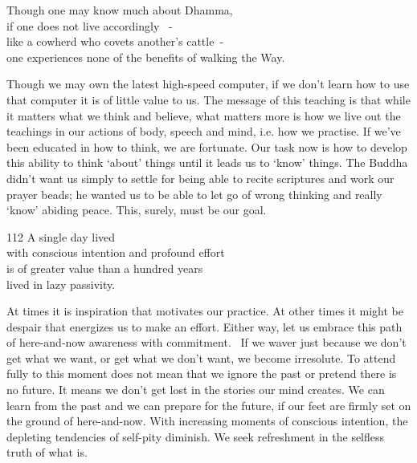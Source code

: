 
\begin{dhpVerse}{19}
\label{dhp-19}
Though one may know much about Dhamma,\\
if one does not live accordingly  -\\
like a cowherd who covets another's cattle -\\
one experiences none of the benefits of walking the Way.
\end{dhpVerse}

\begin{dhpRefl}
Though we may own the latest high-speed computer, if we don't learn how to use that computer it is of little value to us. The message of this teaching is that while it matters what we think and believe, what matters more is how we live out the teachings in our actions of body, speech and mind, i.e. how we practise. If we've been educated in how to think, we are fortunate. Our task now is how to develop this ability to think `about' things until it leads us to `know' things. The Buddha didn't want us simply to settle for being able to recite scriptures and work our prayer beads; he wanted us to be able to let go of wrong thinking and really `know' abiding peace. This, surely, must be our goal.
\end{dhpRefl}


\begin{dhpVerse}{112}
\label{dhp-112}
A single day lived\\
with conscious intention and profound effort\\
is of greater value than a hundred years\\
lived in lazy passivity.
\end{dhpVerse}

\begin{dhpRefl}
At times it is inspiration that motivates our practice. At other times it might be despair that energizes us to make an effort. Either way, let us embrace this path of here-and-now awareness with commitment.  If we waver just because we don't get what we want, or get what we don't want, we become irresolute. To attend fully to this moment does not mean that we ignore the past or pretend there is no future. It means we don't get lost in the stories our mind creates. We can learn from the past and we can prepare for the future, if our feet are firmly set on the ground of here-and-now. With increasing moments of conscious intention, the depleting tendencies of self-pity diminish. We seek refreshment in the selfless truth of what is.
\end{dhpRefl}

